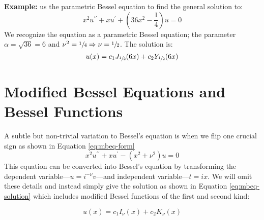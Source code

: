 \vspace{0.5cm}

\noindent\textbf{Example:} us the parametric Bessel equation to find the general solution to:
\begin{equation*}
x^2u^{\prime \prime} + xu^{\prime} + \left(36x^2 - \frac{1}{4} \right)u = 0
\end{equation*}
We recognize the equation as a parametric Bessel equation; the parameter $\alpha = \sqrt{36} = 6$ and $\nu^2 = \sfrac{1}{4} \Rightarrow \nu = \sfrac{1}{2}$.  The solution is:
\begin{equation*}
u(x) = c_1 J_{\sfrac{1}{2}}(6x) + c_2Y_{\sfrac{1}{2}}(6x)
\end{equation*}

\section{Modified Bessel Equations and Bessel Functions}
A subtle but non-trivial variation to Bessel's equation is when we flip one crucial sign as shown in Equation \ref{eq:mbeq-form}
\begin{equation}
x^2u^{\prime \prime} + xu^{\prime}-\left(x^2 + \nu^2\right)u = 0
\label{eq:mbeq-form}
\end{equation}
This equation can be converted into Bessel's equation by transforming the dependent variable---$u=i^{-\nu}v$---and independent variable---$t=ix$.  We will omit these details and instead simply give the solution as shown in Equation \ref{eq:mbeq-solution} which includes modified Bessel functions of the first and second kind:

\begin{equation}
u(x) = c_1I_{\nu}(x) + c_2K_{\nu}(x)
\label{eq:mbeq-solution}
\end{equation}

